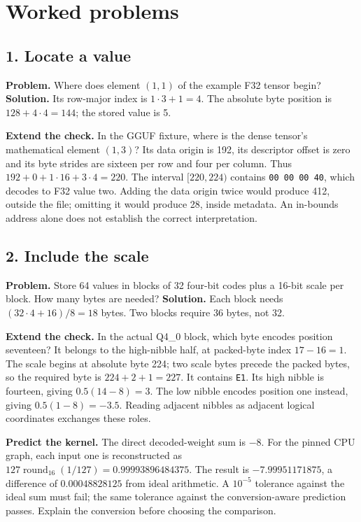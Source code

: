 \section{Worked problems}
\subsection*{1. Locate a value}
\textbf{Problem.} Where does element $(1,1)$ of the example F32 tensor begin?
\textbf{Solution.} Its row-major index is $1\cdot3+1=4$.
The absolute byte position is $128+4\cdot4=144$; the stored value is 5.

\textbf{Extend the check.} In the GGUF fixture, where is the dense
tensor's mathematical element $(1,3)$? Its data origin is 192, its
descriptor offset is zero and its byte strides are sixteen per row
and four per column. Thus $192+0+1\cdot16+3\cdot4=220$.
The interval $[220,224)$ contains \texttt{00 00 00 40}, which
decodes to F32 value two. Adding the data origin twice would produce
412, outside the file; omitting it would produce 28, inside metadata.
An in-bounds address alone does not establish the correct interpretation.
\subsection*{2. Include the scale}
\textbf{Problem.} Store 64 values in blocks of 32 four-bit codes plus a
16-bit scale per block. How many bytes are needed?
\textbf{Solution.} Each block needs $(32\cdot4+16)/8=18$ bytes.
Two blocks require 36 bytes, not 32.

\textbf{Extend the check.} In the actual Q4\_0 block, which byte
encodes position seventeen? It belongs to the high-nibble half, at
packed-byte index $17-16=1$. The scale begins at absolute byte 224;
two scale bytes precede the packed bytes, so the required byte is
$224+2+1=227$. It contains \texttt{E1}. Its high nibble is fourteen,
giving $0.5(14-8)=3$. The low nibble encodes position one instead,
giving $0.5(1-8)=-3.5$. Reading adjacent nibbles as adjacent
logical coordinates exchanges these roles.

\textbf{Predict the kernel.} The direct decoded-weight sum is $-8$.
For the pinned CPU graph, each input one is reconstructed as
$127\operatorname{round}_{16}(1/127)=0.99993896484375$.
The result is $-7.99951171875$, a difference of $0.00048828125$
from ideal arithmetic. A $10^{-5}$ tolerance against the ideal sum
must fail; the same tolerance against the conversion-aware prediction
passes. Explain the conversion before choosing the comparison.
